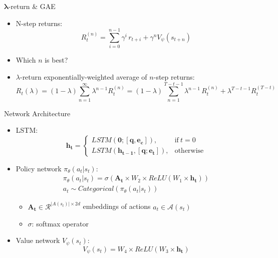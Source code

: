 \documentclass[table]{beamer}
\begin{document}
\begin{frame}{$\mathbf{\lambda}$-return \& GAE}
  \begin{itemize}
    \item N-step returns:
    \begin{equation*}
      R_t^{(n)} = \sum_{i=0}^{n-1} \gamma^i \, r_{t+i} + \gamma^n V_{\psi} (s_{t+n}) 
    \end{equation*}
    \item Which $n$ is best?
    \item $\lambda$-return exponentially-weighted average of $n$-step returns:
    \begin{equation*}
      R_t(\lambda) = (1- \lambda) \sum_{n=1}^{\infty} \lambda^{n-1} R_t^{(n)} = (1-\lambda) \sum_{n=1}^{T-t-1} \lambda^{n-1} \, R_t^{(n)} + \lambda^{T-t-1} R_t^{(T-t)} 
    \end{equation*}
  \end{itemize}
\end{frame}

\begin{frame}{Network Architecture}
\begin{itemize}
    \item LSTM:
    \begin{equation*}
      \mathbf{h_t}=
        \begin{cases}
          LSTM(\mathbf{0}; [\mathbf{q}, \mathbf{e_c}]), & \text{if}\ t=0 \\
          LSTM(\mathbf{h_{t-1}}, [\mathbf{q}; \mathbf{e_t}]), & \text{otherwise}
        \end{cases}
    \end{equation*}
    \item Policy network $\pi_{\theta}(a_t | s_t)$:
    \begin{equation*}
      \begin{split}
      \pi_\theta(a_t | s_t) = \sigma(\mathbf{A_t} \times W_2 \times ReLU(W_1 \times \mathbf{h_t})) \\
      a_t \sim Categorical(\pi_\theta(a_t | s_t))
      \end{split}
    \end{equation*}
    \begin{itemize}
      \item $\mathbf{A_t} \in \mathcal{R}^{|A(s_t)| \times 2d}$ embeddings of actions $a_t \in \mathcal{A}(s_t)$
      \item $\sigma$: softmax operator
    \end{itemize}
    \item Value network $V_{\psi}(s_t)$:
    \begin{equation*}
      V_{\psi}(s_t) = W_4 \times ReLU(W_3 \times \mathbf{h_t})
    \end{equation*}

\end{itemize}
\end{frame}
\end{document}
